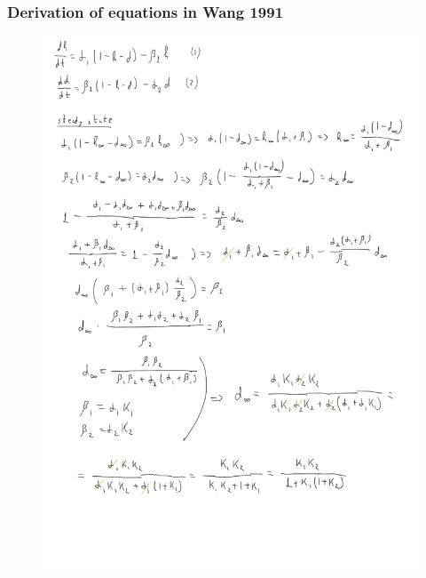 \documentclass[../../workflow.tex]{subfiles}
\begin{document}
\subsubsection{Derivation of equations in Wang 1991}\label{sec_derivation_wang_1991}
\begin{figure}[H]
    \centering
    \includegraphics[height=0.9\textheight, page=1]{Handwritten Notes/R5 Model/Z2 - Notes Wang 1991 T-Type.pdf}
\end{figure}





\newpage
\end{document}
